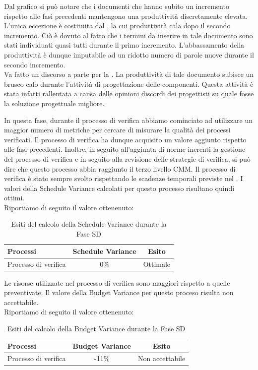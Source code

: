				Dal grafico si può notare che i documenti che hanno subito un incremento rispetto alle fasi precedenti mantengono una produttività discretamente elevata. L'unica eccezione è costituita dal , la cui produttività cala dopo il secondo incremento. Ciò è dovuto al fatto che i termini da inserire in tale documento sono stati individuati quasi tutti durante il primo incremento. L'abbassamento della produttività è dunque imputabile ad un ridotto numero di parole nuove durante il secondo incremento.\\
				Va fatto un discorso a parte per la . La produttività di tale documento subisce un brusco calo durante l'attività di progettazione delle componenti. Questa attività è stata infatti rallentata a causa delle opinioni discordi dei progettisti su quale fosse la soluzione progettuale migliore.
			
			In questa fase, durante il processo di verifica abbiamo cominciato ad utilizzare un maggior numero di metriche per cercare di misurare la qualità dei processi verificati. Il processo di verifica ha dunque acquisito un valore aggiunto rispetto alle fasi precedenti. Inoltre, in seguito all'aggiunta di norme inerenti la gestione del processo di verifica e in seguito alla revisione delle strategie di verifica, si può dire che questo processo abbia raggiunto il terzo livello CMM. 
			Il processo di verifica è stato sempre svolto rispettando le scadenze temporali previste nel . I valori della Schedule Variance calcolati per questo processo risultano quindi ottimi.\\
			Riportiamo di seguito il valore ottenenuto:
			\begin{table}[H]
					\centering
					\begin{tabu}{| l | c | c |}
							\hline
							Processi 							& Schedule Variance	& Esito		\\ \hline \hline
							Processo di verifica & 0\% & Ottimale \\ \hline
						\end{tabu}
					\caption{Esiti del calcolo della Schedule Variance durante la Fase SD}
				\end{table}	

			Le risorse utilizzate nel processo di verifica sono maggiori rispetto a quelle preventivate. Il valore della Budget Variance per questo proceso risulta non accettabile.\\ 
			Riportiamo di seguito il valore ottenenuto:
			\begin{table}[H]
					\centering
					\begin{tabu}{| l | c | c |}
							\hline
							Processi 							& Budget Variance	& Esito		\\ \hline \hline
							Processo di verifica & -11\% & Non accettabile \\ \hline
						\end{tabu}
					\caption{Esiti del calcolo della Budget Variance durante la Fase SD}
				\end{table}	
							
